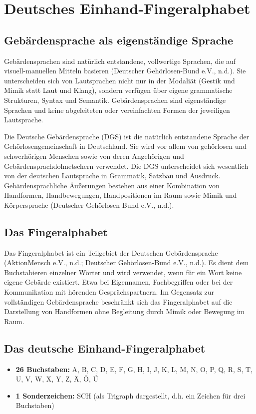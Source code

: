 \section{Deutsches Einhand-Fingeralphabet}

\subsection{Gebärdensprache als eigenständige Sprache}
Gebärdensprachen sind natürlich entstandene, vollwertige Sprachen, die auf visuell-manuellen Mitteln basieren (Deutscher Gehörlosen-Bund e.V., n.d.). Sie unterscheiden sich von Lautsprachen nicht nur in der Modaliät (Gestik und Mimik statt Laut und Klang), sondern verfügen über eigene grammatische Strukturen, Syntax und Semantik. Gebärdensprachen sind eigenständige Sprachen und keine abgeleiteten oder vereinfachten Formen der jeweiligen Lautsprache.

Die Deutsche Gebärdensprache (DGS) ist die natürlich entstandene Sprache der Gehörlosengemeinschaft in Deutschland. Sie wird vor allem von gehörlosen und schwerhörigen Menschen sowie von deren Angehörigen und Gebärdensprachdolmetschern verwendet. Die DGS unterscheidet sich wesentlich von der deutschen Lautsprache in Grammatik, Satzbau und Ausdruck. Gebärdensprachliche Äußerungen bestehen aus einer Kombination von Handformen, Handbewegungen, Handpositionen im Raum sowie Mimik und Körpersprache (Deutscher Gehörlosen-Bund e.V., n.d.).

\subsection{Das Fingeralphabet}
Das Fingeralphabet ist ein Teilgebiet der Deutschen Gebärdensprache (AktionMensch e.V., n.d.; Deutscher Gehörlosen-Bund e.V., n.d.). Es dient dem Buchstabieren einzelner Wörter und wird verwendet, wenn für ein Wort keine eigene Gebärde existiert. Etwa bei Eigennamen, Fachbegriffen oder bei der Kommunikation mit hörenden Gesprächspartnern. Im Gegensatz zur vollständigen Gebärdensprache beschränkt sich das Fingeralphabet auf die Darstellung von Handformen ohne Begleitung durch Mimik oder Bewegung im Raum.

\subsection{Das deutsche Einhand-Fingeralphabet}

\begin{itemize}
    \item \textbf{26 Buchstaben:} A, B, C, D, E, F, G, H, I, J, K, L, M, N, O, P, Q, R, S, T, U, V, W, X, Y, Z, Ä, Ö, Ü
    \item \textbf{1 Sonderzeichen:} SCH (als Trigraph dargestellt, d.h. ein Zeichen für drei Buchstaben)
\end{itemize}

